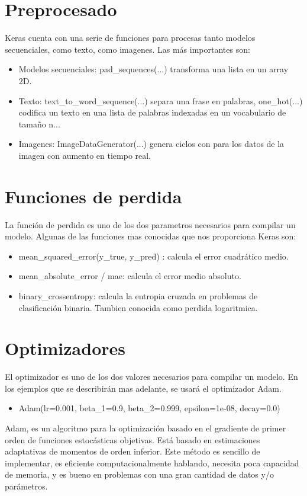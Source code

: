 \section{Preprocesado}
Keras cuenta con una serie de funciones para procesas tanto modelos secuenciales, como texto, como imagenes. Las más importantes son:
\begin{itemize}
\item Modelos secuenciales: pad\_sequences(...) transforma una lista en un array 2D.
\item Texto: text\_to\_word\_sequence(...) separa una frase en palabras, one\_hot(...) codifica un texto en una lista de palabras indexadas en un vocabulario de tamaño n...
\item Imagenes: ImageDataGenerator(...) genera ciclos con para los datos de la imagen con aumento en tiempo real.
\end{itemize}
\section{Funciones de perdida}
La función de perdida es uno de los dos parametros necesarios para compilar un modelo. Algunas de las funciones mas conocidas que nos proporciona Keras son:
\begin{itemize}[noitemsep]
\item mean\_squared\_error(y\_true, y\_pred) : calcula el error cuadrático medio. 
\item mean\_absolute\_error / mae: calcula el error medio absoluto.
\item binary\_crossentropy: calcula la entropia cruzada en problemas de clasificación binaria. Tambien conocida como perdida logaritmica.
\end{itemize}
\section{Optimizadores}
El optimizador es uno de los dos valores necesarios para compilar un modelo. En los ejemplos que se describirán mas adelante, se usará el optimizador Adam.
\begin{itemize}
\item Adam(lr=0.001, beta\_1=0.9, beta\_2=0.999, epsilon=1e-08, decay=0.0)
\end{itemize}
Adam, es un algoritmo para la optimización basado en el gradiente de primer orden de funciones estocásticas objetivas. Está basado en estimaciones adaptativas de momentos de orden inferior. Este método es sencillo de implementar, es eficiente computacionalmente hablando, necesita poca capacidad de memoria, y es bueno en problemas con una gran cantidad de datos y/o parámetros.
